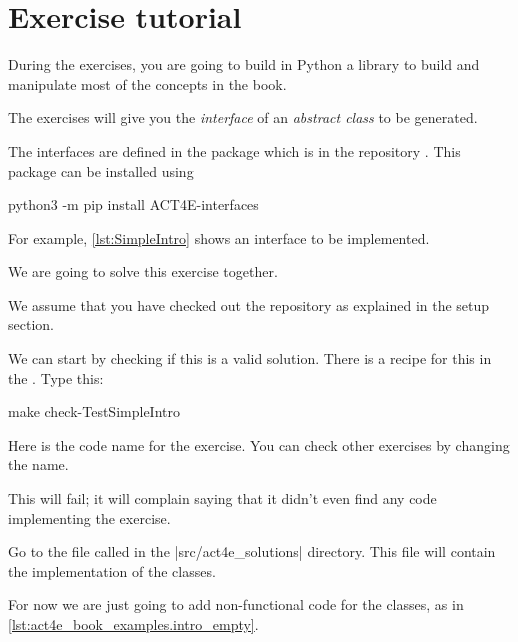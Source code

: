 
\section{Exercise tutorial}
\label{sec:exercise-tutorial}

During the exercises, you are going to build in Python a library to build and manipulate most of the concepts in the book.

The exercises will give you the \emph{interface} of an \emph{abstract class} to be generated.

The interfaces are defined in the package  which is in the repository .
This package can be installed using

\begin{console}
python3 -m pip install ACT4E-interfaces
\end{console}

For example, \cref{lst:SimpleIntro} shows an interface  to be implemented.


We are going to solve this exercise together.

We assume that you have checked out the repository as explained in the setup section.


We can start by checking if this is a valid solution.
There is a recipe for this in the .
Type this:

\begin{console}
    make check-TestSimpleIntro
\end{console}

Here  is the code name for the exercise.
You can check other exercises by changing the name.

This will fail; it will complain saying that it didn't even find any code implementing the exercise.

Go to the file called  in the \files|src/act4e_solutions| directory.
This file will contain the implementation of the classes.

For now we are just going to add non-functional code for the classes, as in \cref{lst:act4e_book_examples.intro_empty}.

\begin{longcode}
    \caption{}

    \label{lst:act4e_book_examples.intro_empty}
\end{longcode}

